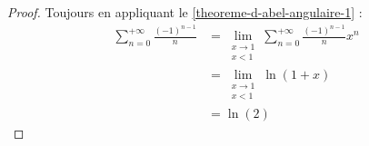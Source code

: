   \begin{proof}
    Toujours en appliquant le \cref{theoreme-d-abel-angulaire-1} :
    \begin{align*}
      \sum_{n=0}^{+\infty} \frac{(-1)^{n-1}}{n} &= \lim_{\substack{x \rightarrow 1 \\ x < 1}} \sum_{n=0}^{+\infty} \frac{(-1)^{n-1}}{n} x^n \\
      &= \lim_{\substack{x \rightarrow 1 \\ x < 1}} \ln(1 + x) \\
      &= \ln(2)
    \end{align*}
  \end{proof}

